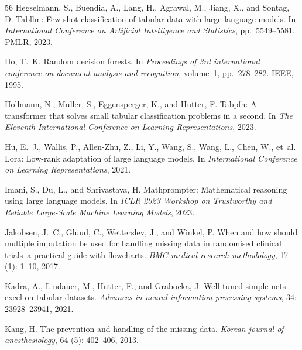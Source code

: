 \documentclass{article}
\theoremstyle{plain}
\theoremstyle{definition}
\theoremstyle{remark}
\begin{document}
\begin{thebibliography}{56}
Hegselmann, S., Buendia, A., Lang, H., Agrawal, M., Jiang, X., and Sontag, D.
\newblock Tabllm: Few-shot classification of tabular data with large language
  models.
\newblock In \emph{International Conference on Artificial Intelligence and
  Statistics}, pp.\  5549--5581. PMLR, 2023.

Ho, T.~K.
\newblock Random decision forests.
\newblock In \emph{Proceedings of 3rd international conference on document
  analysis and recognition}, volume~1, pp.\  278--282. IEEE, 1995.

Hollmann, N., M{\"u}ller, S., Eggensperger, K., and Hutter, F.
\newblock Tabpfn: A transformer that solves small tabular classification
  problems in a second.
\newblock In \emph{The Eleventh International Conference on Learning
  Representations}, 2023.

Hu, E.~J., Wallis, P., Allen-Zhu, Z., Li, Y., Wang, S., Wang, L., Chen, W.,
  et~al.
\newblock Lora: Low-rank adaptation of large language models.
\newblock In \emph{International Conference on Learning Representations}, 2021.

Imani, S., Du, L., and Shrivastava, H.
\newblock Mathprompter: Mathematical reasoning using large language models.
\newblock In \emph{ICLR 2023 Workshop on Trustworthy and Reliable Large-Scale
  Machine Learning Models}, 2023.

Jakobsen, J.~C., Gluud, C., Wetterslev, J., and Winkel, P.
\newblock When and how should multiple imputation be used for handling missing
  data in randomised clinical trials--a practical guide with flowcharts.
\newblock \emph{BMC medical research methodology}, 17 (1):
  1--10, 2017.

Kadra, A., Lindauer, M., Hutter, F., and Grabocka, J.
\newblock Well-tuned simple nets excel on tabular datasets.
\newblock \emph{Advances in neural information processing systems},
  34: 23928--23941, 2021.

Kang, H.
\newblock The prevention and handling of the missing data.
\newblock \emph{Korean journal of anesthesiology}, 64 (5):
  402--406, 2013.


\end{thebibliography}
\end{document}
